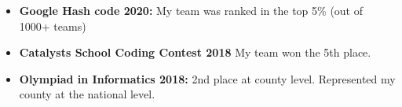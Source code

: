 
\begin{itemize}


\item \textbf{Google Hash code 2020:} My team was ranked in the top 5\% (out of 1000+ teams)

\item \textbf{Catalysts School Coding Contest 2018} My team won the 5th place.

\item \textbf{Olympiad in Informatics 2018:} 2nd place at county level. Represented my county at the national level.

\end{itemize} 
